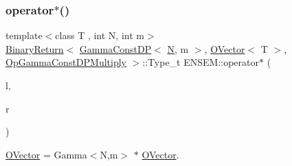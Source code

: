 \subsubsection{\texorpdfstring{operator$\ast$()}{operator*()}\hspace{0.1cm}{\footnotesize\ttfamily [7/8]}}
{\footnotesize\ttfamily template$<$class T , int N, int m$>$ \\
\mbox{\hyperlink{structENSEM_1_1BinaryReturn}{Binary\+Return}}$<$ \mbox{\hyperlink{classENSEM_1_1GammaConstDP}{Gamma\+Const\+DP}}$<$ \mbox{\hyperlink{adat__devel_2lib_2hadron_2operator__name__util_8cc_a7722c8ecbb62d99aee7ce68b1752f337}{N}}, m $>$, \mbox{\hyperlink{classENSEM_1_1OVector}{O\+Vector}}$<$ T $>$, \mbox{\hyperlink{structENSEM_1_1OpGammaConstDPMultiply}{Op\+Gamma\+Const\+D\+P\+Multiply}} $>$\+::Type\+\_\+t E\+N\+S\+E\+M\+::operator$\ast$ (\begin{DoxyParamCaption}\item[{const \mbox{\hyperlink{classENSEM_1_1GammaConstDP}{Gamma\+Const\+DP}}$<$ \mbox{\hyperlink{adat__devel_2lib_2hadron_2operator__name__util_8cc_a7722c8ecbb62d99aee7ce68b1752f337}{N}}, m $>$ \&}]{l,  }\item[{const \mbox{\hyperlink{classENSEM_1_1OVector}{O\+Vector}}$<$ T $>$ \&}]{r }\end{DoxyParamCaption})\hspace{0.3cm}{\ttfamily [inline]}}



\mbox{\hyperlink{classENSEM_1_1OVector}{O\+Vector}} = Gamma$<$\+N,m$>$ $\ast$ \mbox{\hyperlink{classENSEM_1_1OVector}{O\+Vector}}. 

\mbox{\label{group__obsvector_ga5641b8f1bc373f5f46ec47d9b0640c64}} 

